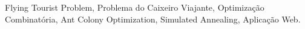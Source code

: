 \noindent 

Flying Tourist Problem, Problema do Caixeiro Viajante, Optimização Combinatória, Ant Colony Optimization, Simulated Annealing, Aplicação Web.